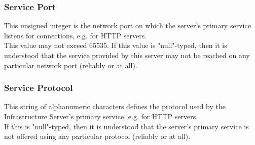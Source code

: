 \subsubsection{Service Port}
This unsigned integer is the network port on which the server's primary service
listens for connections, e.g.  for HTTP servers.\\
This value may not exceed 65535. If this value is "null"-typed, then it is
understood that the service provided by this server may not be reached on any
particular network port (reliably or at all).

\subsubsection{Service Protocol}
This string of alphanumeric characters defines the protocol used by the
Infrastructure Server's primary service, e.g.  for HTTP servers.\\
If this is "null"-typed, then it is understood that the server's primary service
is not offered using any particular protocol (reliably or at all).
